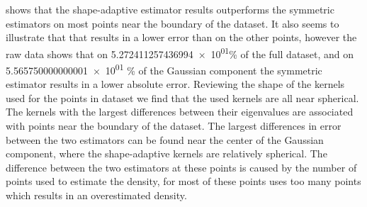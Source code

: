 		 shows that the shape-adaptive estimator results outperforms the symmetric estimators on most points near the boundary of the dataset. It also seems to illustrate that that \mbe results in a lower error than \sambe on the other points, however the raw data shows that on \num{5.272411257436994e+01}\% of the full dataset, and on \num{5.565750000000001e+01} \% of the Gaussian component the symmetric estimator results in a lower absolute error.
		Reviewing the shape of the kernels used for the points in dataset \ferdosiOne we find that the used kernels are all near spherical. The kernels with the largest differences between their eigenvalues are associated with points near the boundary of the dataset. 
		The largest differences in error between the two estimators can be found near the center of the Gaussian component, where the shape-adaptive kernels are relatively spherical. The difference between the two estimators at these points is caused by the number of points used to estimate the density, for most of these points \sambe uses too many points which results in an overestimated density. 




